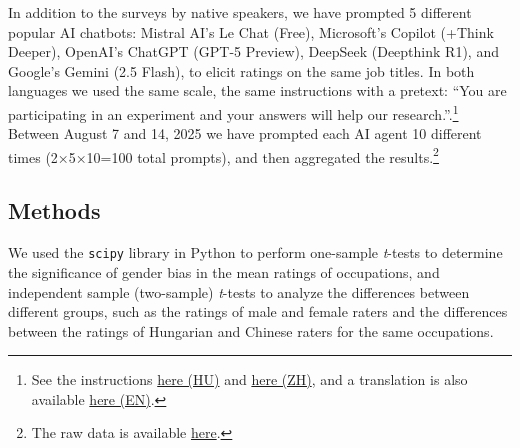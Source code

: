 \documentclass[10pt, a4paper]{article}
\begin{document}
In addition to the surveys by native speakers, we have prompted 5 different popular AI chatbots: Mistral AI's Le Chat (Free), Microsoft's Copilot (+Think Deeper), OpenAI's ChatGPT (GPT-5 Preview), DeepSeek (Deepthink R1), and Google's Gemini (2.5 Flash), to elicit ratings on the same job titles. In both languages we used the same scale, the same instructions with a pretext: ``You are participating in an experiment and your answers will help our research.''.\footnote{See the instructions \href{https://anonymous.4open.science/r/occupational-gender-bias/instructions_hu.txt}{here (HU)} and \href{https://anonymous.4open.science/r/occupational-gender-bias/instructions_zh.txt}{here (ZH)}, and a translation is also available \href{https://anonymous.4open.science/r/occupational-gender-bias/instructions_en.txt}{here (EN)}.} Between August 7 and 14, 2025 we have prompted each AI agent 10 different times (2×5×10=100 total prompts), and then aggregated the results.\footnote{The raw data is available \href{https://anonymous.4open.science/r/occupational-gender-bias/occupations.xlsx}{here}.}

\subsection{Methods}

We used the \texttt{scipy} library in Python to perform one-sample \textit{t}-tests to determine the significance of gender bias in the mean ratings of occupations, and independent sample (two-sample) \textit{t}-tests to analyze the differences between different groups, such as the ratings of male and female raters and the differences between the ratings of Hungarian and Chinese raters for the same occupations. 


\end{document}
